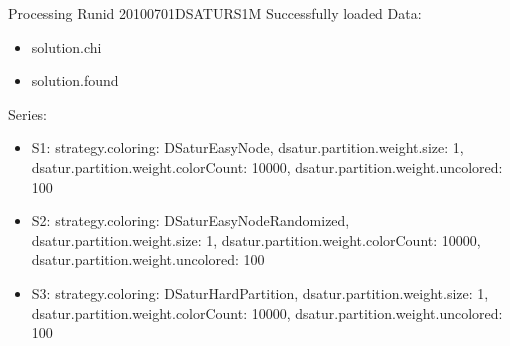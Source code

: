 \documentclass[landscape, 12pt]{report}
\begin{document}
Processing Runid 20100701DSATURS1M
 Successfully loaded
Data:
\begin{itemize}
\item solution.chi
\item solution.found
\end{itemize}
Series:
\begin{itemize}
\item S1: strategy.coloring: DSaturEasyNode, dsatur.partition.weight.size: 1, dsatur.partition.weight.colorCount: 10000, dsatur.partition.weight.uncolored: 100
\item S2: strategy.coloring: DSaturEasyNodeRandomized, dsatur.partition.weight.size: 1, dsatur.partition.weight.colorCount: 10000, dsatur.partition.weight.uncolored: 100
\item S3: strategy.coloring: DSaturHardPartition, dsatur.partition.weight.size: 1, dsatur.partition.weight.colorCount: 10000, dsatur.partition.weight.uncolored: 100
\end{itemize}
\end{document}
